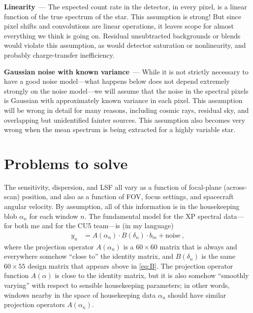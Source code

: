 \documentclass[11pt]{article}
\renewcommand{\paragraph}[1]{\medskip\par\noindent\textbf{#1}~---}
\begin{document}
\paragraph{Linearity}
The expected count rate in the detector, in every pixel, is a linear function of the true spectrum of the star.
This assumption is strong!
But since pixel shifts and convolutions are linear operations, it leaves scope for almost everything we think is going on.
Residual unsubtracted backgrounds or blends would violate this assumption, as would detector saturation or nonlinearity, and probably charge-transfer inefficiency.

\paragraph{Gaussian noise with known variance}
While it is not strictly necessary to have a good noise model---what happens below does not depend extremely strongly on the noise model---we will assume that the noise in the spectral pixels is Gaussian with approximately known variance in each pixel.
This assumption will be wrong in detail for many reasons, including cosmic rays, residual sky, and overlapping but unidentified fainter sources.
This assumption also becomes very wrong when the mean spectrum is being extracted for a highly variable star.

\section{Problems to solve}

The sensitivity, dispersion, and LSF all vary as a function of focal-plane (across-scan) position, and also as a function of FOV, focus settings, and spacecraft angular velocity.
By assumption, all of this information is in the housekeeping blob $\alpha_n$ for each window $n$.
The fundamental model for the XP spectral data---for both me and for the CU5 team---is (in my language)
\begin{align}
    y_n &= A(\alpha_n)\cdot B(\delta_n)\cdot b_m + \mbox{noise} ~,\label{eq:A}
\end{align}
where the projection operator $A(\alpha_n)$ is a $60\times 60$ matrix that is always and everywhere somehow ``close to'' the identity matrix, and $B(\delta_n)$ is the same $60\times 55$ design matrix that appears above in \eqref{eq:B}.
The projection operator function $A(\alpha)$ is close to the identity matrix, but it is also somehow ``smoothly varying'' with respect to sensible housekeeping parameters; in other words, windows nearby in the space of housekeeping data $\alpha_n$ should have similar projection operators $A(\alpha_n)$.
\end{document}
